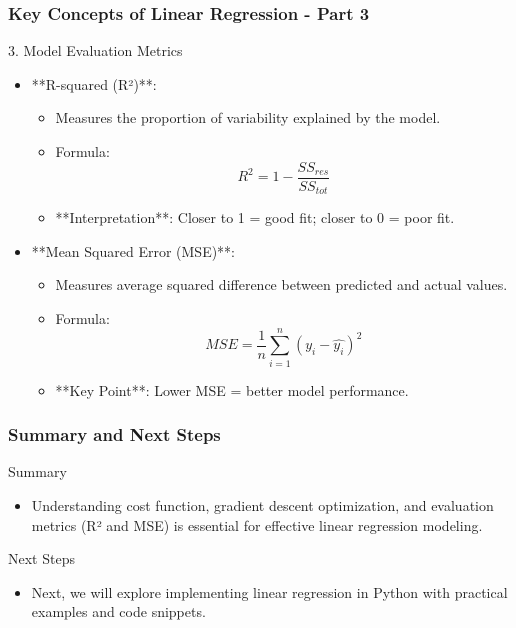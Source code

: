 \documentclass{beamer}
\begin{document}
\begin{frame}[fragile]
    \frametitle{Key Concepts of Linear Regression - Part 3}
    \begin{block}{3. Model Evaluation Metrics}
        \begin{itemize}
            \item **R-squared (R²)**:
                \begin{itemize}
                    \item Measures the proportion of variability explained by the model.
                    \item Formula:
                    \[
                    R^2 = 1 - \frac{SS_{res}}{SS_{tot}}
                    \]
                    \item **Interpretation**: Closer to 1 = good fit; closer to 0 = poor fit.
                \end{itemize}
            \item **Mean Squared Error (MSE)**:
                \begin{itemize}
                    \item Measures average squared difference between predicted and actual values.
                    \item Formula:
                    \[
                    MSE = \frac{1}{n} \sum_{i=1}^{n} (y_i - \hat{y_i})^2
                    \]
                    \item **Key Point**: Lower MSE = better model performance.
                \end{itemize}
        \end{itemize}
    \end{block}
\end{frame}

\begin{frame}[fragile]
    \frametitle{Summary and Next Steps}
    \begin{block}{Summary}
        \begin{itemize}
            \item Understanding cost function, gradient descent optimization, and evaluation metrics (R² and MSE) is essential for effective linear regression modeling.
        \end{itemize}
    \end{block}
    
    \begin{block}{Next Steps}
        \begin{itemize}
            \item Next, we will explore implementing linear regression in Python with practical examples and code snippets.
        \end{itemize}
    \end{block}
\end{frame}
\end{document}
